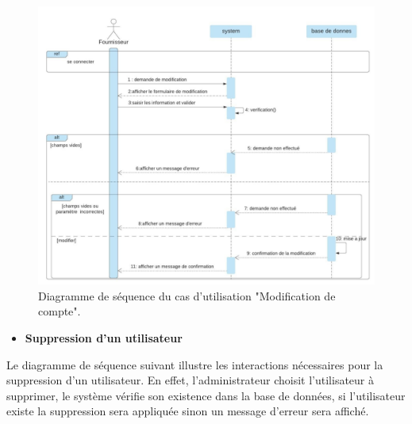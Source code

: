 \documentclass[french]{report}
\begin{document}
        \begin{figure}[H]
            \centering
            \includegraphics[width=1\textwidth]{images/sequence diag modifier compte.jpg}
            \caption{Diagramme de séquence du cas d'utilisation "Modification de compte".}
            \label{fig:my_label}
        \end{figure}
        
        \begin{itemize}
            \item \textbf{Suppression d'un utilisateur}
        \end{itemize}
        Le diagramme de séquence suivant illustre les interactions nécessaires pour la suppression d'un utilisateur.
	En effet, l'administrateur choisit l'utilisateur à supprimer, le système vérifie son existence dans la base de données,
	si l'utilisateur existe la suppression sera appliquée sinon un message d'erreur sera affiché.
        
\end{document}
